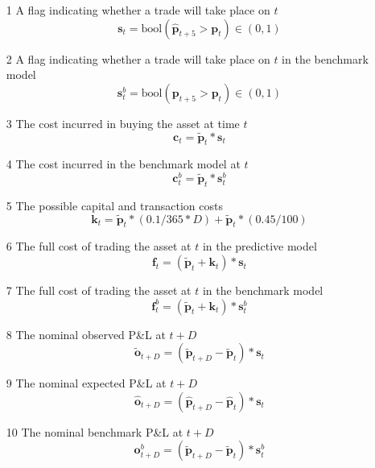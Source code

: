 \documentclass[a4paper,11pt,oneside]{article}
\theoremstyle{plain}
\theoremstyle{definition}
\begin{document}
	\begin{itemize}
		\item [1] A flag indicating whether a trade will take place on $t$
		\begin{equation}
				\mathbf{s}_t = \mathrm{bool}(\mathbf{\hat{p}}_{t+5} > \mathbf{p}_t) \in (0, 1)
		\end{equation}
		\item [2] A flag indicating whether a trade will take place on $t$ in the benchmark model
		\begin{equation}
				\mathbf{s}^b_{t} = \mathrm{bool}({\mathbf{p}}_{t+5} > \mathbf{p}_t) \in (0, 1)
		\end{equation}
		
		\item [3] The cost incurred in buying the asset at time $t$
		\begin{equation}
			\mathbf{c}_t = \mathbf{\tilde{p}}_t * \mathbf{s}_t
		\end{equation}
		\item [4] The cost incurred in the benchmark model at $t$
		\begin{equation}
				\mathbf{c}^b_{t} = \mathbf{\tilde{p}}_t * \mathbf{s}^b_{t}
		\end{equation}
		\item [5] The possible capital and transaction costs
		\begin{equation}\label{eq_capital_costs}
			\mathbf{k}_t= \mathbf{\tilde{p}}_t * (0.1 / 365 * D) + \mathbf{\tilde{p}}_t * (0.45 / 100)
		\end{equation}
		\item [6] The full cost of trading the asset at $t$ in the predictive model
		\begin{equation}
			\mathbf{f}_t = (\mathbf{\tilde{p}}_t + \mathbf{k}_t) * \mathbf{s}_t
		\end{equation}	
		\item [7] The full cost of trading the asset at $t$ in the benchmark model
		\begin{equation}
			\mathbf{f}^b_{t} = (\mathbf{\tilde{p}}_t + \mathbf{k}_t) * \mathbf{s}^b_{t}
		\end{equation}
		
		
		\item [8] The nominal observed P\&L at $t+D$
		\begin{equation}
			\mathbf{\tilde{o}}_{t + D} = \left( \mathbf{\tilde{p}}_{t+D} - \mathbf{\tilde{p}}_t \right) * \mathbf{s}_t
		\end{equation}	
		\item [9] The nominal expected P\&L at $t+D$
		\begin{equation}
		\mathbf{\hat{o}}_{t + D} = \left( \mathbf{\hat{p}}_{t+D} - \mathbf{\hat{p}}_t \right ) * \mathbf{s}_t
		\end{equation}
		\item [10] The nominal benchmark P\&L at $t+D$
		\begin{equation}
			\mathbf{o}^b_{t + D} = \left( \mathbf{\tilde{p}}_{t+D} - \mathbf{\tilde{p}}_t \right) * \mathbf{s}^b_{t}
		\end{equation}
		

\end{itemize}
\end{document}
